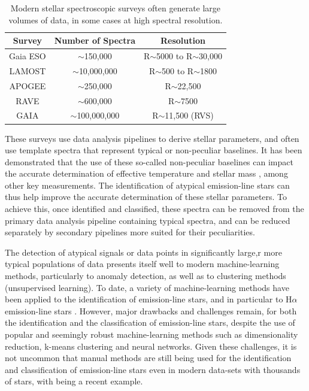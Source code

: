 \begin{table}[!htb]
\begin{center}
\begin{tabular}{|c|c|c|}
\hline
\textbf{Survey} & \textbf{Number of Spectra} & \textbf{Resolution} \\ \hline
Gaia ESO        & $\sim$150,000              & R$\sim$5000 to R$\sim$30,000             \\ \hline
LAMOST          & $\sim$10,000,000           & R$\sim$500 to R$\sim$1800              \\ \hline
APOGEE          & $\sim$250,000              & R$\sim$22,500             \\ \hline
RAVE            & $\sim$600,000              & R$\sim$7500                 \\ \hline
GAIA            & $\sim$100,000,000          & R$\sim$11,500 (RVS)               \\ \hline
\end{tabular}
\caption{Modern stellar spectroscopic surveys often generate large volumes of data, in some cases at high spectral resolution.}
\label{table:draglift1}
\end{center}
\end{table}
These surveys use data analysis pipelines to derive stellar parameters, and often use template spectra that represent typical or non-peculiar baselines. It has been demonstrated that the use of these so-called non-peculiar baselines can impact the accurate determination of effective temperature \citep{cayrel2011halpha, amarsi2018effective, giribaldi2019accurate} and stellar mass \citep{ness2016spectroscopic, bergemann2016gaia}, among other key measurements. The identification of atypical emission-line stars can thus help improve the accurate determination of these stellar parameters. To achieve this, once identified and classified, these spectra can be removed from the primary data analysis pipeline containing typical spectra, and can be reduced separately by secondary pipelines more suited for their peculiarities. 

The detection of atypical signals or data points in significantly large,r more typical populations of data presents itself well to modern machine-learning methods, particularly to anomaly detection, as well as to clustering methods (unsupervised learning). To date, a variety of machine-learning methods have been applied to the identification of emission-line stars, and in particular to H$\alpha$ emission-line stars . However, major drawbacks and challenges remain, for both the identification and the classification of emission-line stars, despite the use of popular and seemingly robust machine-learning methods such as dimensionality reduction, k-means clustering and neural networks. Given these challenges, it is not uncommon that manual methods are still being used for the identification and classification of emission-line stars even in modern data-sets with thousands of stars, with \citet{zhang2021catalog} being a recent example.  

